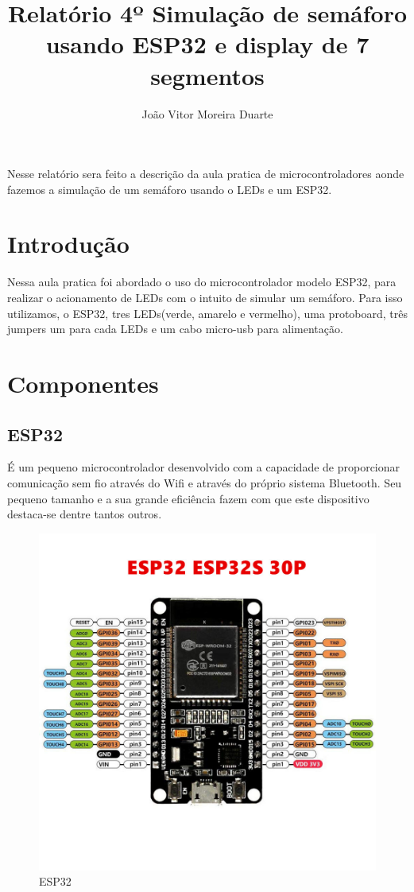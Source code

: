 \documentclass[12pt]{article}
\title{Relatório 4º Simulação de semáforo usando ESP32 e display de 7 segmentos}
\author{João Vitor Moreira Duarte }
\begin{document}
\maketitle
\begin{resumo}
  Nesse relatório sera feito a descrição da aula pratica de microcontroladores aonde fazemos a simulação de um semáforo usando o LEDs e um ESP32.
\end{resumo}


\section{Introdução}
Nessa aula pratica foi abordado o uso do microcontrolador modelo ESP32, para realizar o acionamento de LEDs
com o intuito de simular um semáforo. Para isso utilizamos, o ESP32, tres LEDs(verde, amarelo e vermelho),
uma protoboard, três jumpers um para cada LEDs e um cabo micro-usb para alimentação.

\section{Componentes} \label{sec:firstpage}

\subsection{ESP32}
É um pequeno microcontrolador desenvolvido com a capacidade de proporcionar comunicação sem fio através do Wifi
e através do próprio sistema Bluetooth. Seu pequeno tamanho e a sua grande eficiência fazem com que este dispositivo
destaca-se dentre tantos outros.

\begin{figure}[ht]
  \centering
  \includegraphics[width=.5\textwidth]{Images/ESP32.jpg}
  \caption{ESP32}
  \label{fig:exampleESP32}
\end{figure}
\end{document}
